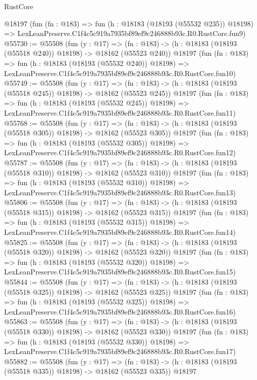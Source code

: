 \begin{lexlean}{RustCore}
\begin{coremodule}
    @18197
    (fun (fn : @183) =>
    fun (h : @18183 (@18193 (@55532 @235)) @18198) =>
    LexLeanPreserve.C1f4c5c919a7935bf89ef9c246888b93c.R0.RustCore.fun9)
@55730 := @55508
    (fun (y : @17) =>
    (fn : @183) -> (h : @18183 (@18193 (@55518 @240)) @18198) -> @18162 (@55523 @240))
    @18197
    (fun (fn : @183) =>
    fun (h : @18183 (@18193 (@55532 @240)) @18198) =>
    LexLeanPreserve.C1f4c5c919a7935bf89ef9c246888b93c.R0.RustCore.fun10)
@55749 := @55508
    (fun (y : @17) =>
    (fn : @183) -> (h : @18183 (@18193 (@55518 @245)) @18198) -> @18162 (@55523 @245))
    @18197
    (fun (fn : @183) =>
    fun (h : @18183 (@18193 (@55532 @245)) @18198) =>
    LexLeanPreserve.C1f4c5c919a7935bf89ef9c246888b93c.R0.RustCore.fun11)
@55768 := @55508
    (fun (y : @17) =>
    (fn : @183) -> (h : @18183 (@18193 (@55518 @305)) @18198) -> @18162 (@55523 @305))
    @18197
    (fun (fn : @183) =>
    fun (h : @18183 (@18193 (@55532 @305)) @18198) =>
    LexLeanPreserve.C1f4c5c919a7935bf89ef9c246888b93c.R0.RustCore.fun12)
@55787 := @55508
    (fun (y : @17) =>
    (fn : @183) -> (h : @18183 (@18193 (@55518 @310)) @18198) -> @18162 (@55523 @310))
    @18197
    (fun (fn : @183) =>
    fun (h : @18183 (@18193 (@55532 @310)) @18198) =>
    LexLeanPreserve.C1f4c5c919a7935bf89ef9c246888b93c.R0.RustCore.fun13)
@55806 := @55508
    (fun (y : @17) =>
    (fn : @183) -> (h : @18183 (@18193 (@55518 @315)) @18198) -> @18162 (@55523 @315))
    @18197
    (fun (fn : @183) =>
    fun (h : @18183 (@18193 (@55532 @315)) @18198) =>
    LexLeanPreserve.C1f4c5c919a7935bf89ef9c246888b93c.R0.RustCore.fun14)
@55825 := @55508
    (fun (y : @17) =>
    (fn : @183) -> (h : @18183 (@18193 (@55518 @320)) @18198) -> @18162 (@55523 @320))
    @18197
    (fun (fn : @183) =>
    fun (h : @18183 (@18193 (@55532 @320)) @18198) =>
    LexLeanPreserve.C1f4c5c919a7935bf89ef9c246888b93c.R0.RustCore.fun15)
@55844 := @55508
    (fun (y : @17) =>
    (fn : @183) -> (h : @18183 (@18193 (@55518 @325)) @18198) -> @18162 (@55523 @325))
    @18197
    (fun (fn : @183) =>
    fun (h : @18183 (@18193 (@55532 @325)) @18198) =>
    LexLeanPreserve.C1f4c5c919a7935bf89ef9c246888b93c.R0.RustCore.fun16)
@55863 := @55508
    (fun (y : @17) =>
    (fn : @183) -> (h : @18183 (@18193 (@55518 @330)) @18198) -> @18162 (@55523 @330))
    @18197
    (fun (fn : @183) =>
    fun (h : @18183 (@18193 (@55532 @330)) @18198) =>
    LexLeanPreserve.C1f4c5c919a7935bf89ef9c246888b93c.R0.RustCore.fun17)
@55882 := @55508
    (fun (y : @17) =>
    (fn : @183) -> (h : @18183 (@18193 (@55518 @335)) @18198) -> @18162 (@55523 @335))
    @18197

\end{coremodule}
\end{lexlean}
